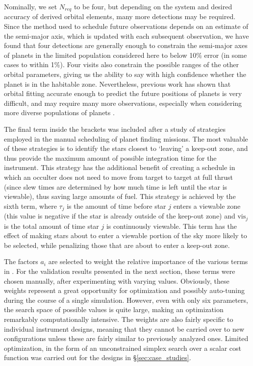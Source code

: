 Nominally, we set $N_{req}$ to be four, but depending on the system and desired accuracy of derived orbital elements, many more detections may be required.  Since the method used to schedule future observations depends on an estimate of the semi-major axis, which is updated with each subsequent observation, we have found that four detections are generally enough to constrain the semi-major axes of planets in the limited population considered here to below 10\% error (in some cases to within 1\%).  Four visits also constrain the possible ranges of the other orbital parameters, giving us the ability to say with high confidence whether the planet is in the habitable zone.  Nevertheless, previous work has shown that orbital fitting accurate enough to predict the future positions of planets is very difficult, and may require many more observations, especially when considering more diverse populations of planets \citep{pravdo2007observation, brown2007minimumTPF}. 

The final term inside the brackets was included after a study of strategies employed in the manual scheduling of planet finding missions.  The most valuable of these strategies is to identify the stars closest to `leaving' a keep-out zone, and thus provide the maximum amount of possible integration time for the instrument.  This strategy has the additional benefit of creating a schedule in which an occulter does not need to move from target to target at full thrust (since slew times are determined by how much time is left until the star is viewable), thus saving large amounts of fuel.  This strategy is achieved by the sixth term, where $\tau_j$ is the amount of time before star $j$ enters a viewable zone (this value is negative if the star is already outside of the keep-out zone) and $\textrm{vis}_j$ is the total amount of time star $j$ is continuously viewable. This term has the effect of making stars about to enter a viewable portion of the sky more likely to be selected, while penalizing those that are about to enter a keep-out zone. 

The factors $a_i$ are selected to weight the relative importance of the various terms in .  For the validation results presented in the next section, these terms were chosen manually, after experimenting with varying values.  Obviously, these weights represent a great opportunity for optimization and possibly auto-tuning during the course of a single simulation.  However, even with only six parameters, the search space of possible values is quite large, making an optimization remarkably computationally intensive.  The weights are also fairly specific to individual instrument designs, meaning that they cannot be carried over to new configurations unless these are fairly similar to previously analyzed ones.  Limited optimization, in the form of an unconstrained simplex search \citep{lagarias1999convergence} over a scalar cost function was carried out for the designs in \S\ref{sec:case_studies}.

